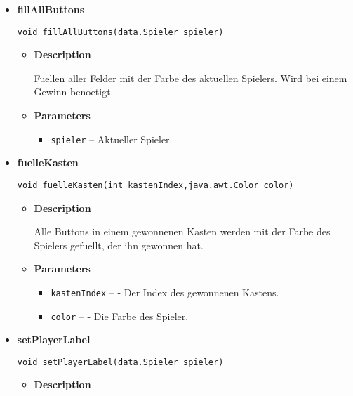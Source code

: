 \documentclass[11pt,a4paper]{report}
\begin{document}
{{{{{{{{{{{{{{{{{\begin{itemize}
{\begin{itemize}
{Schliessen des Frame.
}
\end{itemize}
}%
\item{ 
{\bf  fillAllButtons}\\
\begin{lstlisting}[frame=none]
void fillAllButtons(data.Spieler spieler)\end{lstlisting} %
\begin{itemize}
\item{
{\bf  Description}

Fuellen aller Felder mit der Farbe des aktuellen Spielers. Wird bei einem Gewinn benoetigt.
}
\item{
{\bf  Parameters}
  \begin{itemize}
   \item{
\texttt{spieler} -- Aktueller Spieler.}
  \end{itemize}
}%
\end{itemize}
}%
\item{ 
{\bf  fuelleKasten}\\
\begin{lstlisting}[frame=none]
void fuelleKasten(int kastenIndex,java.awt.Color color)\end{lstlisting} %
\begin{itemize}
\item{
{\bf  Description}

Alle Buttons in einem gewonnenen Kasten werden mit der Farbe des Spielers gefuellt, der ihn gewonnen hat.
}
\item{
{\bf  Parameters}
  \begin{itemize}
   \item{
\texttt{kastenIndex} -- - Der Index des gewonnenen Kastens.}
   \item{
\texttt{color} -- - Die Farbe des Spieler.}
  \end{itemize}
}%
\end{itemize}
}%
\item{ 
{\bf  setPlayerLabel}\\
\begin{lstlisting}[frame=none]
void setPlayerLabel(data.Spieler spieler)\end{lstlisting} %
\begin{itemize}
\item{
{\bf  Description}

}
\end{itemize}}
\end{itemize}}}}}}}}}}}}}}}}}}
\end{document}
